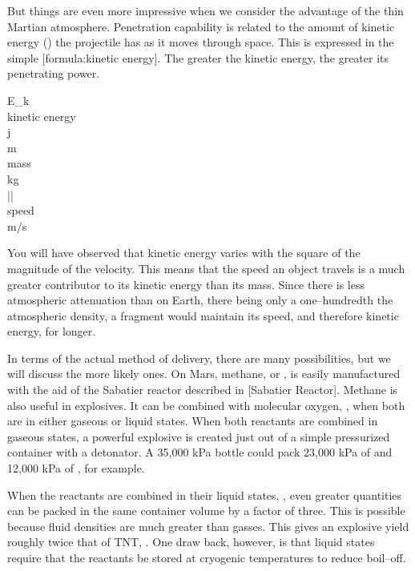 But things are even more impressive when we consider the advantage of the thin Martian atmosphere. Penetration capability is related to the amount of kinetic energy () the projectile has as it moves through space. This is expressed in the simple [formula:kinetic energy]. The greater the kinetic energy, the greater its penetrating power.

\crlf
{}
\startformula
{}
\stopformula
\startlegend
\leg E_k \\ kinetic energy \\ j \\
\leg m \\ mass \\ kg \\
\leg || \\ speed \\ m/s \\
\stoplegend
\crlf

You will have observed that kinetic energy varies with the square of the magnitude of the velocity. This means that the speed an object travels is a much greater contributor to its kinetic energy than its mass. Since there is less atmospheric attenuation than on Earth, there being only a one--hundredth the atmospheric density, a fragment would maintain its speed, and therefore kinetic energy, for longer.

In terms of the actual method of delivery, there are many possibilities, but we will discuss the more likely ones. On Mars, methane, or , is easily manufactured with the aid of the Sabatier reactor described in [Sabatier Reactor]. Methane is also useful in explosives. It can be combined with molecular oxygen, , when both are in either gaseous or liquid states. When both reactants are combined in gaseous states, a powerful explosive is created just out of a simple pressurized container with a detonator. A 35,000 kPa bottle could pack 23,000 kPa of  and 12,000 kPa of , for example.

When the reactants are combined in their liquid states, , even greater quantities can be packed in the same container volume by a factor of three. This is possible because fluid densities are much greater than gasses. This gives an explosive yield roughly twice that of TNT, . One draw back, however, is that liquid states require that the reactants be stored at cryogenic temperatures to reduce boil--off.

